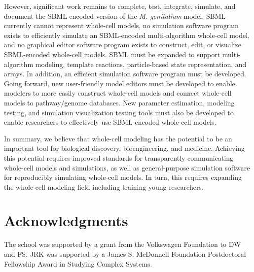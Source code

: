 \documentclass[journal,transmag]{IEEEtran}
\begin{document}
However, significant work remains to complete, test, integrate, simulate, and document the SBML-encoded version of the \textit{M. genitalium} model. SBML currently cannot represent whole-cell models, no simulation software program exists to efficiently simulate an SBML-encoded multi-algorithm whole-cell model, and no graphical editor software program exists to construct, edit, or visualize SBML-encoded whole-cell models. SBML must be expanded to support multi-algorithm modeling, template reactions, particle-based state representation, and arrays. In addition, an efficient simulation software program must be developed. Going forward, new user-friendly model editors must be developed to enable modelers to more easily construct whole-cell models and connect whole-cell models to pathway/genome databases. New parameter estimation, modeling testing, and simulation visualization testing tools must also be developed to enable researchers to effectively use SBML-encoded whole-cell models.

In summary, we believe that whole-cell modeling has the potential to be an important tool for biological discovery, bioengineering, and medicine. 
Achieving this potential requires improved standards for transparently communicating whole-cell models and simulations, as well as general-purpose simulation software for reproducibly simulating whole-cell models.
In turn, this requires expanding the whole-cell modeling field including training young researchers.

\section*{Acknowledgments}
The school was supported by a grant from the Volkswagen Foundation to DW and FS. JRK was supported by a James S. McDonnell Foundation Postdoctoral Fellowship Award in Studying Complex Systems.

\ifCLASSOPTIONcaptionsoff
  \newpage
\fi




% 
\end{document}
